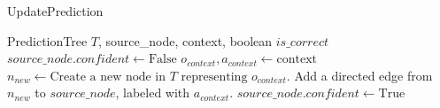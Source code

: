 \documentclass[11pt]{article}
\begin{document}
\begin{algorithm}[H]
\caption{UpdatePrediction}
\label{alg:update_prediction}
\begin{algorithmic}[1]
\Require PredictionTree $T$, source\_node, context, boolean $is\_correct$
 
    \State $source\_node.confident \gets \text{False}$
 
    \State $o_{context}, a_{context} \gets \text{context}$
        \State $n_{new} \gets \text{Create a new node in } T \text{ representing } o_{context}.$
        \State Add a directed edge from $n_{new}$ to $source\_node$, labeled with $a_{context}.$
    \EndIf
    \State $source\_node.confident \gets \text{True}$ 
\EndIf
\end{algorithmic}
\end{algorithm}
\end{document}
